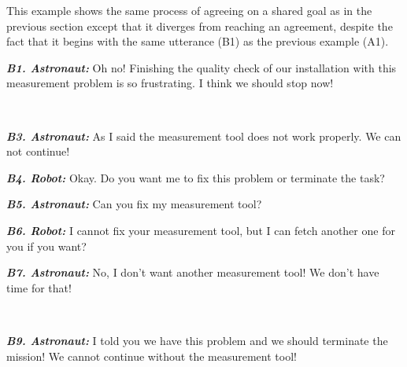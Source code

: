This example shows the same process of agreeing on a shared goal as in the
previous section except that it diverges from reaching an agreement, despite the
fact that it begins with the same utterance (B1) as the previous example (A1). 

\begin{description}
  \item \textit{\textbf{B1. Astronaut:}} Oh no! Finishing the quality check of
  our installation with this measurement problem is so frustrating. I think we
  should stop now!\\

  \item {}\\
  
  \item \textit{\textbf{B3. Astronaut:}} As I said the measurement tool does not
  work properly. We can not continue!\\

  \item \textit{\textbf{B4. Robot:}} Okay. Do you want me to fix this problem
  or terminate the task?\\

  \item \textit{\textbf{B5. Astronaut:}} Can you fix my measurement tool?\\
  
  \item \textit{\textbf{B6. Robot:}} I cannot fix your measurement tool, but I
  can fetch another one for you if you want?\\
  
  \item \textit{\textbf{B7. Astronaut:}} No, I don't want another measurement tool!
  We don't have time for that!\\
  
  \item {}\\
  
  \item \textit{\textbf{B9. Astronaut:}} I told you we have this problem and we
  should terminate the mission! We cannot continue without the measurement
  tool!
\end{description}

